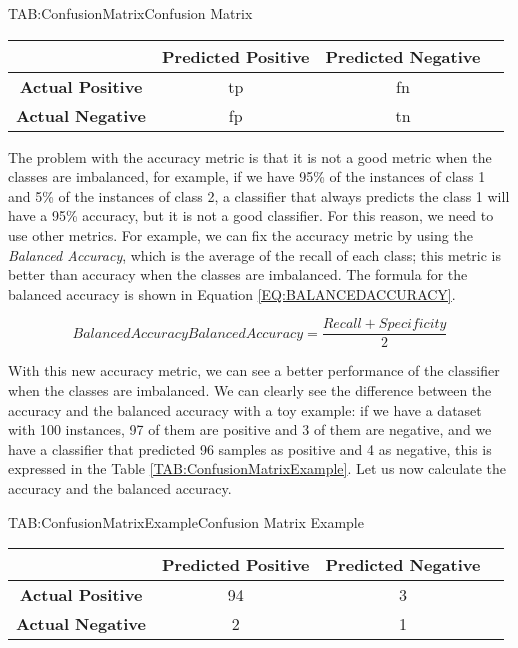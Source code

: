 \begin{table}[Confusion Matrix]{TAB:ConfusionMatrix}{Confusion Matrix}
    \begin{tabular}{cccc}
            \hline
            & \textbf{Predicted Positive} & \textbf{Predicted Negative} \\
            \hline \hline
            \textbf{Actual Positive} & \acl{tp} & \acl{fn} \\
            \textbf{Actual Negative} & \acl{fp}  & \acl{tn} \\
            \hline
        \end{tabular}
\end{table}


The problem with the accuracy metric is that it is not a good metric when the classes are imbalanced, for example, if we have 95\% of the instances of class 1 and 5\% of the instances of class 2, a classifier that always predicts the class 1 will have a 95\% accuracy, but it is not a good classifier. For this reason, we need to use other metrics. For example, we can fix the accuracy metric by using the \textit{Balanced Accuracy}, which is the average of the recall of each class; this metric is better than accuracy when the classes are imbalanced. The formula for the balanced accuracy is shown in Equation \ref{EQ:BALANCEDACCURACY}.

\begin{equation}[EQ:BALANCEDACCURACY]{Balanced Accuracy}
    \boxed{Balanced Accuracy = \frac{Recall + Specificity}{2}}
\end{equation}

With this new accuracy metric, we can see a better performance of the classifier when the classes are imbalanced. We can clearly see the difference between the accuracy and the balanced accuracy with a toy example: if we have a dataset with 100 instances, 97 of them are positive and 3 of them are negative, and we have a classifier that predicted 96 samples as positive and 4 as negative, this is expressed in the Table \ref{TAB:ConfusionMatrixExample}. Let us now calculate the accuracy and the balanced accuracy.

\begin{table}[Confusion Matrix Example]{TAB:ConfusionMatrixExample}{Confusion Matrix Example}
    \begin{tabular}{cccc}
            \hline
            & \textbf{Predicted Positive} & \textbf{Predicted Negative} \\
            \hline \hline
            \textbf{Actual Positive} & 94 & 3 \\
            \textbf{Actual Negative} & 2 & 1 \\
            \hline
        \end{tabular}
\end{table}

